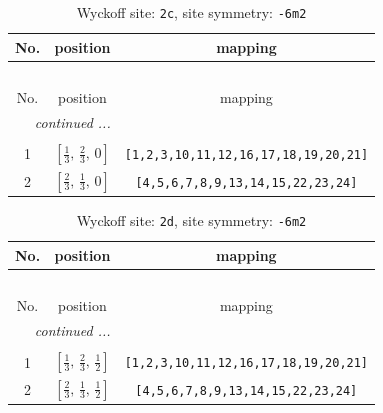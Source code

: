 \documentclass[fleqn,8pt]{jsarticle}
\begin{document}
\begin{longtable}{ccc}
\caption{Wyckoff site: {\tt 2c}, site symmetry: {\tt -6m2}}
 \\
 \hline \hline
No. & position & mapping \\ \hline \endfirsthead

\multicolumn{2}{l}{\tablename\ \thetable{}} \\
 \hline \hline
No. & position & mapping \\ \hline \endhead

 \hline \hline
\multicolumn{2}{r}{\footnotesize\it continued ...} \\ \endfoot

 \hline \hline
\multicolumn{2}{r}{} \\ \endlastfoot

1 & $\left[ \frac{1}{3},\, \frac{2}{3},\, 0 \right]$ & {\tt [1,2,3,10,11,12,16,17,18,19,20,21]} \\ \hline
2 & $\left[ \frac{2}{3},\, \frac{1}{3},\, 0 \right]$ & {\tt [4,5,6,7,8,9,13,14,15,22,23,24]} \\
\end{longtable}
\renewcommand{\arraystretch}{1.2}
\begin{longtable}{ccc}
\caption{Wyckoff site: {\tt 2d}, site symmetry: {\tt -6m2}}
 \\
 \hline \hline
No. & position & mapping \\ \hline \endfirsthead

\multicolumn{2}{l}{\tablename\ \thetable{}} \\
 \hline \hline
No. & position & mapping \\ \hline \endhead

 \hline \hline
\multicolumn{2}{r}{\footnotesize\it continued ...} \\ \endfoot

 \hline \hline
\multicolumn{2}{r}{} \\ \endlastfoot

1 & $\left[ \frac{1}{3},\, \frac{2}{3},\, \frac{1}{2} \right]$ & {\tt [1,2,3,10,11,12,16,17,18,19,20,21]} \\ \hline
2 & $\left[ \frac{2}{3},\, \frac{1}{3},\, \frac{1}{2} \right]$ & {\tt [4,5,6,7,8,9,13,14,15,22,23,24]} \\
\end{longtable}
\renewcommand{\arraystretch}{1.2}
\end{document}
